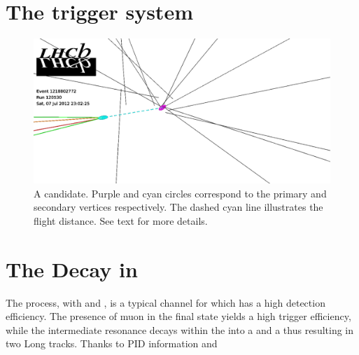 \section{The trigger system}
\label{det_trigger}


\begin{figure}[t]
  \centering
 \includegraphics[width=\textwidth,trim=0cm 3cm 17cm 0cm, clip=true]{Figures/Chapter2/jpsikst_event}
  \caption{A \BsJpsiKst candidate. Purple and cyan circles correspond to the primary and secondary
           vertices respectively. The dashed cyan line illustrates the \Bs flight distance.
          See text for more details.}
  \label{det_jpsikst_cand}
\end{figure}

\section{The \BsJpsiKst Decay in \lhcb}
\label{BspsiKst_at_lhcb}

The \BsJpsiKst process, with \Jpsimumu and \KstKpi, is a typical channel for which \lhcb has a high detection efficiency.
The presence of muon in the final state yields a high trigger efficiency, while the intermediate
\Kstarz resonance decays within the \velo into a \Kp and a \pim thus resulting in two Long tracks.
Thanks to PID information and

